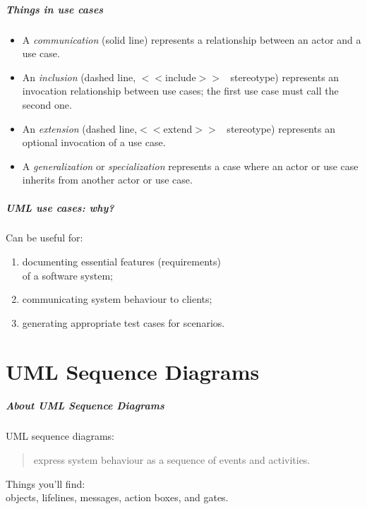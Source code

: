 \begin{frame}
\frametitle{Things in use cases}

\begin{changemargin}{1cm}


\begin{itemize}
\item A \emph{communication} (solid line) represents a relationship
between an actor and a use case.
\item An \emph{inclusion} (dashed line, {\scriptsize$<<$}include{\scriptsize$>>$} ~stereotype)
represents an invocation relationship between use cases; the first use 
case must call the second one.
\item An \emph{extension} (dashed line,{\scriptsize$<<$}extend{\scriptsize$>>$} ~stereotype)
represents an optional invocation of a use case.
\item A \emph{generalization} or \emph{specialization} represents
a case where an actor or use case inherits from another actor or use case.
\end{itemize}
\end{changemargin}
\end{frame}

\begin{frame}
\frametitle{UML use cases: why?}

\begin{changemargin}{1cm}
Can be useful for:
\begin{enumerate}
\item documenting essential features (requirements)\\ of
a software system;
\item communicating system behaviour to clients; 
\item generating appropriate test cases for scenarios.
\end{enumerate}
\end{changemargin}
\end{frame}

\part{UML Sequence Diagrams}
\frame{\partpage}

\begin{frame}
\frametitle{About UML Sequence Diagrams}

\begin{changemargin}{1cm}

UML sequence diagrams:
\end{changemargin}
\begin{quote}
 express system behaviour as a sequence
of events and activities.
\end{quote}

\begin{changemargin}{1cm}
Things you'll find: \\
objects, lifelines, messages,
action boxes, and gates.
\end{changemargin}
\end{frame}

